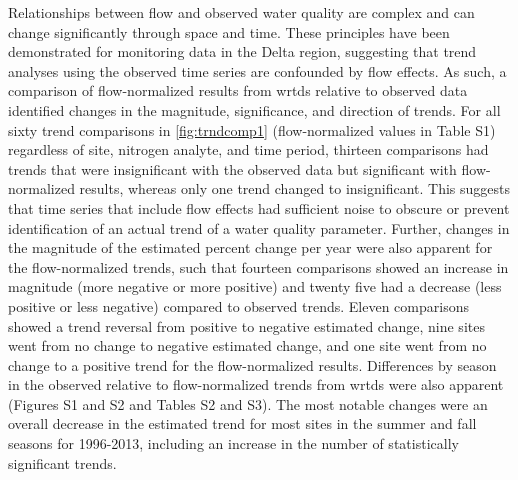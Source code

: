 \documentclass[letterpaper,12pt,oneside]{article}\usepackage[]{graphicx}\usepackage[]{color}
\begin{document}
Relationships between flow and observed water quality are complex and can change significantly through space and time\cite{Hirsch10,Zhang16}. These principles have been demonstrated for monitoring data in the Delta region\cite{Jassby08,Novick15,Jabusch16}, suggesting that trend analyses using the observed time series are confounded by flow effects. As such, a comparison of flow-normalized results from \ac{wrtds} relative to observed data identified changes in the magnitude, significance, and direction of trends. For all sixty trend comparisons in \cref{fig:trndcomp1} (flow-normalized values in Table S1) regardless of site, nitrogen analyte, and time period, thirteen comparisons had trends that were insignificant with the observed data but significant with flow-normalized results, whereas only one trend changed to insignificant. This suggests that time series that include flow effects had sufficient noise to obscure or prevent identification of an actual trend of a water quality parameter. Further, changes in the magnitude of the estimated percent change per year were also apparent for the flow-normalized trends, such that fourteen comparisons showed an increase in magnitude (more negative or more positive) and twenty five had a decrease (less positive or less negative) compared to observed trends.  Eleven comparisons showed a trend reversal from positive to negative estimated change, nine sites went from no change to negative estimated change, and one site went from no change to a positive trend for the flow-normalized results. Differences by season in the observed relative to flow-normalized trends from \ac{wrtds} were also apparent (Figures S1 and S2 and Tables S2 and S3). The most notable changes were an overall decrease in the estimated trend for most sites in the summer and fall seasons for 1996-2013, including an increase in the number of statistically significant trends.
\end{document}
